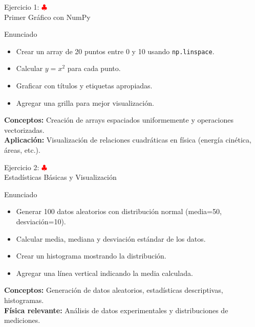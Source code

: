 \documentclass[10pt]{beamer}
\begin{document}
\begin{frame}{Ejercicio 1: \hfill \textcolor{red}{$\clubsuit$} \\ Primer Gráfico con NumPy}
  \begin{block}{Enunciado}
    \begin{itemize}
      \item Crear un array de 20 puntos entre 0 y 10 usando \texttt{np.linspace}.
      \item Calcular \(y = x^2\) para cada punto.
      \item Graficar con títulos y etiquetas apropiadas.
      \item Agregar una grilla para mejor visualización.
    \end{itemize}
  \end{block}
  
  \textbf{Conceptos:} Creación de arrays espaciados uniformemente y operaciones vectorizadas.
  \\
  \textbf{Aplicación:} Visualización de relaciones cuadráticas en física (energía cinética, áreas, etc.).
\end{frame}

\begin{frame}{Ejercicio 2: \hfill \textcolor{red}{$\clubsuit$} \\ Estadísticas Básicas y Visualización}
  \begin{block}{Enunciado}
    \begin{itemize}
      \item Generar 100 datos aleatorios con distribución normal (media=50, desviación=10).
      \item Calcular media, mediana y desviación estándar de los datos.
      \item Crear un histograma mostrando la distribución.
      \item Agregar una línea vertical indicando la media calculada.
    \end{itemize}
  \end{block}
  
  \textbf{Conceptos:} Generación de datos aleatorios, estadísticas descriptivas, histogramas.
  \\
  \textbf{Física relevante:} Análisis de datos experimentales y distribuciones de mediciones.
\end{frame}
\end{document}
